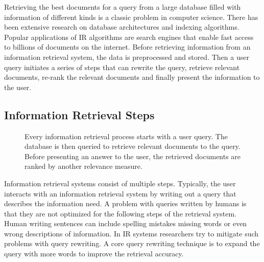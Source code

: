 \documentclass[../main.tex]{subfiles}
\begin{document}
Retrieving the best documents for a query from a large database
filled with information of different kinds is a classic problem in computer science.
There has been extensive research on database architectures and indexing algorithms.
Popular applications of IR algorithms are search engines
that enable fast access to billions of documents on the internet.
Before retrieving information from an information retrieval system,
the data is preprocessed and stored.
Then a user query initiates a series of steps that can rewrite the query,
retrieve relevant documents,
re-rank the relevant documents and finally present the information to the user.

\subsection{Information Retrieval Steps}

\begin{figure}[t]
    \centering
    \caption{Every information retrieval process starts with a user query.
        The database is then queried to retrieve relevant documents to the query.
        Before presenting an answer to the user, the retrieved documents are ranked by another relevance measure.}
    \label{fig:ir_steps}
\end{figure}
Information retrieval systems consist of multiple steps.
Typically, the user interacts with an information retrieval system
by writing out a query that describes the information need.
A problem with queries written by humans is that they are not optimized for the following steps of the retrieval system.
Human writing sentences can include spelling mistakes missing words or even wrong descriptions of information.
In IR systems researchers try to mitigate such problems with query rewriting.
A core query rewriting technique is to expand the query with more words to improve the retrieval accuracy.
\end{document}

